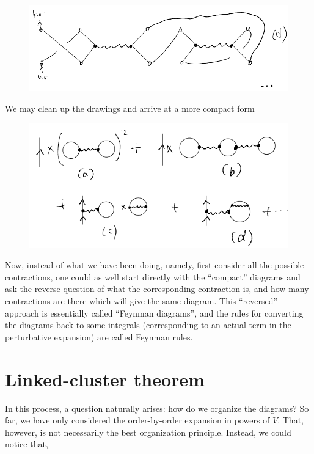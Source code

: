 \begin{figure}[H]
    \centering
    \includegraphics[width=\textwidth]{jupyterbook/data/fig/lec17-fig10.png}
\end{figure}

We may clean up the drawings and arrive at a more compact form

\begin{figure}[H]
    \centering
    \includegraphics[width=\textwidth]{jupyterbook/data/fig/lec17-fig11.png}
\end{figure}

Now, instead of what we have been doing, namely, first consider all the possible contractions, one could as well start directly with the ``compact'' diagrams and ask the reverse question of what the corresponding contraction is, and how many contractions are there which will give the same diagram. This ``reversed'' approach is essentially called ``Feynman diagrams'', and the rules for converting the diagrams back to some integrals (corresponding to an actual term in the perturbative expansion) are called Feynman rules.

\section{Linked-cluster theorem}

In this process, a question naturally arises: how do we organize the diagrams? So far, we have only considered the order-by-order expansion in powers of $V$. That, however, is not necessarily the best organization principle. Instead, we could notice that,


